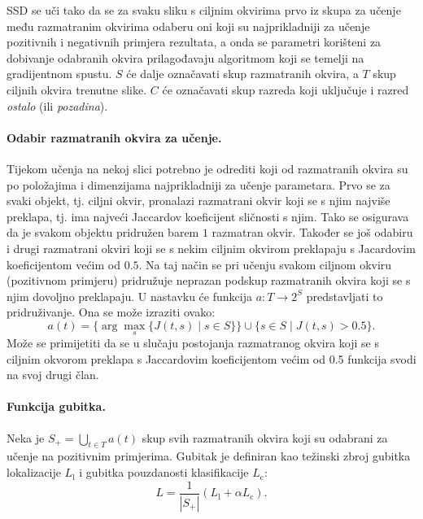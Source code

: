 \documentclass[utf8, diplomski, numeric, lmodern]{fer}
\begin{document}
SSD se uči tako da se za svaku sliku s ciljnim okvirima prvo iz skupa za učenje među razmatranim okvirima odaberu oni koji su najprikladniji za učenje pozitivnih i negativnih primjera rezultata, a onda se parametri korišteni za dobivanje odabranih okvira prilagođavaju algoritmom koji se temelji na gradijentnom spustu. $S$ će dalje označavati skup razmatranih okvira, a $T$ skup ciljnih okvira trenutne slike. $C$ će označavati skup razreda koji uključuje i razred \emph{ostalo} (ili \emph{pozadina}).

\paragraph{Odabir razmatranih okvira za učenje.} Tijekom učenja na nekoj slici potrebno je odrediti koji od razmatranih okvira su po položajima i dimenzijama najprikladniji za učenje parametara. Prvo se za svaki objekt, tj. ciljni okvir, pronalazi razmatrani okvir koji se s njim najviše preklapa, tj. ima najveći Jaccardov koeficijent sličnosti s njim. Tako se osigurava da je svakom objektu pridružen barem $1$ razmatran okvir. Također se još odabiru i drugi razmatrani okviri koji se s nekim ciljnim okvirom preklapaju s Jacardovim koeficijentom većim od $0.5$. Na taj način se pri učenju svakom ciljnom okviru (pozitivnom primjeru) pridružuje neprazan podskup razmatranih okvira koji se s njim dovoljno preklapaju. U nastavku će funkcija $a\colon T\to 2^S$ predstavljati to pridruživanje. Ona se može izraziti ovako:
\begin{equation}
	a(t) = \{\arg\!\max_s \{ J(t,s) \mid s\in S\}\} \cup \{s\in S\mid J(t,s) > 0.5 \}.
\end{equation}
Može se primijetiti da se u slučaju postojanja razmatranog okvira koji se s ciljnim okvorom preklapa s Jaccardovim koeficijentom većim od 0.5 funkcija svodi na svoj drugi član.

\paragraph{Funkcija gubitka.}\label{par:ssd-ucenje-gubitak}
Neka je $S_+=\bigcup_{t\in T} a(t)$ skup svih razmatranih okvira koji su odabrani za učenje na pozitivnim primjerima. Gubitak je definiran kao težinski zbroj gubitka lokalizacije $L_\mathrm{l}$ i gubitka pouzdanosti klasifikacije $L_\mathrm{c}$:
\begin{equation}
L = \frac{1}{\left| S_+\right|}(L_\mathrm{l} + \alpha L_\mathrm{c}).
\end{equation}
\end{document}
